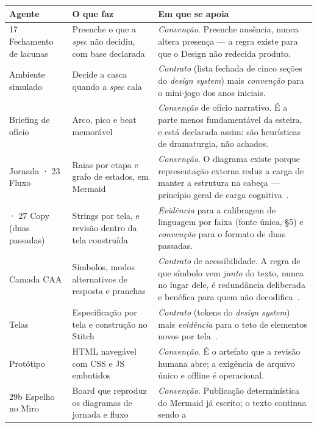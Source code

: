 \documentclass[11pt,a4paper]{article}
\begin{document}
\begin{center}
\begin{longtable}{p{2.5cm}p{5.4cm}p{6.6cm}}
\toprule
\textbf{Agente} & \textbf{O que faz} & \textbf{Em que se apoia} \\
\midrule
\endfirsthead
17 Fechamento de lacunas & Preenche o que a \emph{spec} não decidiu, com base declarada &
\textit{Convenção}. Preenche ausência, nunca altera presença --- a regra existe para que o Design
não redecida produto. \\
\addlinespace
19 Ambiente simulado & Decide a casca quando a \emph{spec} cala &
\textit{Contrato} (lista fechada de cinco seções do \emph{design system}) mais \textit{convenção}
para o mini-jogo dos anos iniciais. \\
\addlinespace
21 Briefing de ofício & Arco, pico e beat memorável &
\textit{Convenção} de ofício narrativo. É a parte menos fundamentável da esteira, e está declarada
assim: são heurísticas de dramaturgia, não achados. \\
\addlinespace
22 Jornada · 23 Fluxo & Raias por etapa e grafo de estados, em Mermaid &
\textit{Convenção}. O diagrama existe porque representação externa reduz a carga de manter a
estrutura na cabeça --- princípio geral de carga cognitiva~\cite{sweller2019}. \\
\addlinespace
24 · 27 Copy (duas passadas) & Strings por tela, e revisão dentro da tela construída &
\textit{Evidência} para a calibragem de linguagem por faixa (fonte única, §5) e
\textit{convenção} para o formato de duas passadas. \\
\addlinespace
25 Camada CAA & Símbolos, modos alternativos de resposta e pranchas &
\textit{Contrato} de acessibilidade. A regra de que símbolo vem \emph{junto} do texto, nunca no
lugar dele, é redundância deliberada e benéfica para quem não decodifica~\cite{knoop2018}. \\
\addlinespace
26 Telas & Especificação por tela e construção no Stitch &
\textit{Contrato} (tokens do \emph{design system}) mais \textit{evidência} para o teto de elementos
novos por tela~\cite{sweller2019}. \\
\addlinespace
28 Protótipo & HTML navegável com CSS e JS embutidos &
\textit{Convenção}. É o artefato que a revisão humana abre; a exigência de arquivo único e offline
é operacional. \\
\addlinespace
29b Espelho no Miro & Board que reproduz os diagramas de jornada e fluxo &
\textit{Convenção}. Publicação determinística do Mermaid já escrito; o texto continua sendo a

\end{longtable}
\end{center}
\end{document}
